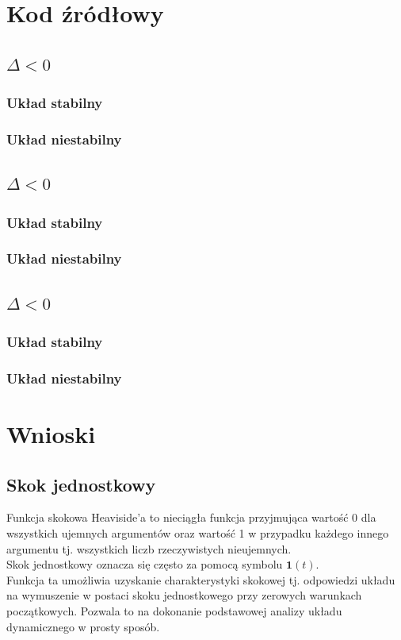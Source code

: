 \documentclass[a4paper]{article}
\begin{document}
\section{Kod źródłowy}
\subsection{$\Delta<0$}
\subsubsection{Układ stabilny}

\subsubsection{Układ niestabilny}

\subsection{$\Delta<0$}
\subsubsection{Układ stabilny}

\subsubsection{Układ niestabilny}

\subsection{$\Delta<0$}
\subsubsection{Układ stabilny}

\subsubsection{Układ niestabilny}


\section{Wnioski}
     \subsection{Skok jednostkowy}
       \indent Funkcja skokowa Heaviside'a to nieciągła funkcja przyjmująca wartość 0 dla wszystkich  ujemnych argumentów oraz wartość 1 w przypadku każdego innego argumentu tj. wszystkich liczb  rzeczywistych nieujemnych. \\
        \indent Skok jednostkowy oznacza się często za pomocą symbolu $\boldsymbol{1}(t)$. \\
        \indent Funkcja ta umożliwia uzyskanie charakterystyki skokowej tj. odpowiedzi układu na wymuszenie w postaci skoku jednostkowego przy zerowych warunkach początkowych. Pozwala to na dokonanie podstawowej analizy układu dynamicznego w prosty sposób.
\end{document}
